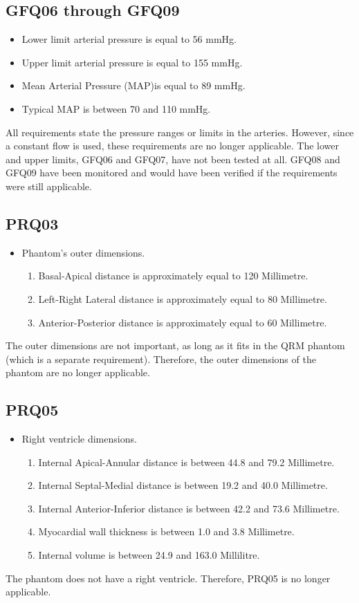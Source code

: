 \subsection*{GFQ06 through GFQ09}
\begin{itemize}[noitemsep]
	\item Lower limit arterial pressure is equal to 56 mmHg.
	\item Upper limit arterial pressure is equal to 155 mmHg.
	\item Mean Arterial Pressure (MAP)is equal to 89 mmHg.
	\item Typical MAP is between 70 and 110 mmHg.
\end{itemize}
All requirements state the pressure ranges or limits in the arteries. However, since a constant flow is used, these requirements are no longer applicable. The lower and upper limits, GFQ06 and GFQ07, have not been tested at all. GFQ08 and GFQ09 have been monitored and would have been verified if the requirements were still applicable.

\subsection*{PRQ03}
\begin{itemize}
	\item Phantom’s outer dimensions.
	\begin{enumerate}[label=\Alph*, noitemsep]
		\item Basal-Apical distance is approximately equal to 120 Millimetre.
		\item Left-Right Lateral distance is approximately equal to 80 Millimetre.
		\item Anterior-Posterior distance is approximately equal to 60 Millimetre.
	\end{enumerate}
\end{itemize}
The outer dimensions are not important, as long as it fits in the QRM phantom (which is a separate requirement). Therefore, the outer dimensions of the phantom are no longer applicable.

\subsection*{PRQ05}
\begin{itemize}
	\item Right ventricle dimensions.
	\begin{enumerate} [label=\Alph*, noitemsep]
		\item Internal Apical-Annular distance is between 44.8 and 79.2 Millimetre.
		\item Internal Septal-Medial distance is between 19.2 and 40.0 Millimetre.
		\item Internal Anterior-Inferior distance is between 42.2 and 73.6 Millimetre.
		\item Myocardial wall thickness is between 1.0 and 3.8 Millimetre.
		\item Internal volume is between 24.9 and 163.0 Millilitre.
	\end{enumerate}
\end{itemize}
The phantom does not have a right ventricle. Therefore, PRQ05 is no longer applicable.

